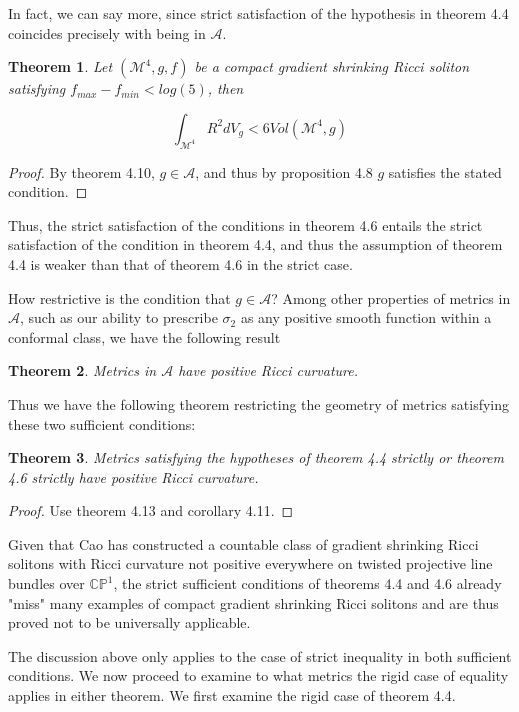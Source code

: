 \documentclass[openany, amssymb, psamsfonts]{amsart}
\newtheorem{thm}{Theorem}[section]
\theoremstyle{definition}
\numberwithin{equation}{section}
\begin{document}
In fact, we can say more, since strict satisfaction of the hypothesis in theorem 4.4 coincides precisely with being in $\mathcal{A}$. 
\begin{thm}
Let $(\mathcal{M}^4, g, f)$ be a compact gradient shrinking Ricci soliton satisfying $f_{max} - f_{min} < log(5)$, then 

$$\int_{\mathcal{M}^4}R^2 dV_g < 6 Vol(\mathcal{M}^4, g)$$

\end{thm}

\begin{proof}
By theorem 4.10, $g \in \mathcal{A}$, and thus by proposition 4.8 $g$ satisfies the stated condition. 

\end{proof}
Thus, the strict satisfaction of the conditions in theorem 4.6 entails the strict satisfaction of the condition in theorem 4.4, and thus the assumption of theorem 4.4 is weaker than that of theorem 4.6 in the strict case.


 How restrictive is the condition that $g \in \mathcal{A}$? Among other properties of metrics in $\mathcal{A}$, such as our ability to prescribe $\sigma_2$ as any positive smooth function within a conformal class, we have the following result \cite{chang}

\begin{thm}
Metrics in $\mathcal{A}$ have positive Ricci curvature. 
\end{thm}
Thus we have the following theorem restricting the geometry of metrics satisfying these two sufficient conditions:
\begin{thm}
Metrics satisfying the hypotheses of theorem 4.4 strictly or theorem 4.6 strictly have positive Ricci curvature.
\end{thm}
\begin{proof}

Use theorem 4.13 and corollary 4.11.

\end{proof}

 Given that Cao \cite{caoTwo} has constructed a countable class of gradient shrinking Ricci solitons with Ricci curvature not positive everywhere on twisted projective line bundles over $\mathbb{CP}^1$, the strict sufficient conditions of theorems 4.4 and 4.6 already "miss" many examples of compact gradient shrinking Ricci solitons and are thus proved not to be universally applicable. 


The discussion above only applies to the case of strict inequality in both sufficient conditions. We now proceed to examine to what metrics the rigid case of equality applies in either theorem. We first examine the rigid case of theorem 4.4.
\end{document}
